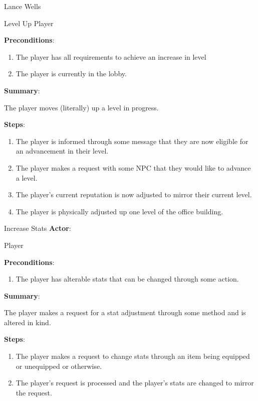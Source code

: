 \documentclass[12pt]{report}
\begin{document}
\begin{section}{Lance Wells}
\begin{subsection}{Level Up}
Player

\textbf{Preconditions}:

\begin{enumerate}
\item The player has all requirements to achieve an increase in level
\item The player is currently in the lobby.
\end{enumerate}

\textbf{Summary}:

The player moves (literally) up a level in progress.

\textbf{Steps}:

\begin{enumerate}
\item The player is informed through some message that they are now eligible
for an advancement in their level.
\item The player makes a request with some NPC that they would like to
advance a level.
\item The player's current reputation is now adjusted to mirror their
current level.
\item The player is physically adjusted up one level of the office building.
\end{enumerate}
\end{subsection}

\begin{subsection}{Increase Stats}
\textbf{Actor}:

Player

\textbf{Preconditions}:

\begin{enumerate}
\item The player has alterable stats that can be changed through some
action.
\end{enumerate}

\textbf{Summary}:

The player makes a request for a stat adjustment through some
method and is altered in kind.

\textbf{Steps}:

\begin{enumerate}
\item The player makes a request to change stats through an item being
equipped or unequipped or otherwise.
\item The player's request is processed and the player's stats are changed
to mirror the request.
\end{enumerate}
\end{subsection}
\end{section}
\end{document}

